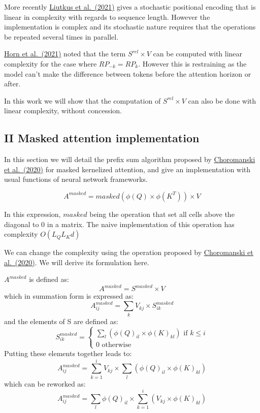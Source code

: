 More recently \href{https://arxiv.org/abs/2105.08399}{Liutkus et
al.~(2021)} gives a stochastic positional encoding that is linear in
complexity with regards to sequence length. However the implementation
is complex and its stochastic nature requires that the operations be
repeated several times in parallel.

\href{https://arxiv.org/abs/2102.07680}{Horn et al.~(2021)} noted that
the term \(S^{rel} \times V\) can be computed with linear complexity for
the case where \(RP_{-k} = RP_{k}\). However this is restraining as the
model can't make the difference between tokens before the attention
horizon or after.

In this work we will show that the computation of \(S^{rel} \times V\)
can also be done with linear complexity, without concession.

\hypertarget{ii-masked-attention-implementation}{%
\subsection{II Masked attention
implementation}\label{ii-masked-attention-implementation}}

In this section we will detail the prefix sum algorithm proposed by
\href{https://arxiv.org/abs/2009.14794}{Choromanski et al.~(2020)} for
masked kernelized attention, and give an implementation with usual
functions of neural network frameworks.

\[A^{masked} = masked \left( \phi(Q) \times \phi(K^T) \right) \times V\]

In this expression, \(masked\) being the operation that set all cells
above the diagonal to 0 in a matrix. The naive implementation of this
operation has complexity \(O(L_QL_Kd)\)

We can change the complexity using the operation proposed by
\href{https://arxiv.org/abs/2009.14794}{Choromanski et al.~(2020)}. We
will derive its formulation here.

\(A^{masked}\) is defined as: \[A^{masked} = S^{masked} \times V\] which
in summation form is expressed as:
\[A^{masked}_{ij} = \sum_k V_{kj} \times S^{masked}_{ik}\] and the
elements of S are defined as: \[S^{masked}_{ik} =
\begin{cases}
    \sum_l \left( \phi(Q)_{il} \times \phi(K)_{kl} \right) \text{ if } k \leq i\\
    0 \text{ otherwise}
\end{cases}\] Putting these elements together leads to:
\[A^{masked}_{ij}= \sum_{k=1}^i V_{kj} \times \sum_l \left( \phi(Q)_{il} \times \phi(K)_{kl} \right)\]
which can be reworked as:
\[A^{masked}_{ij}= \sum_l \phi(Q)_{il} \times \sum_{k=1}^i \left( V_{kj} \times \phi(K)_{kl} \right)\]

